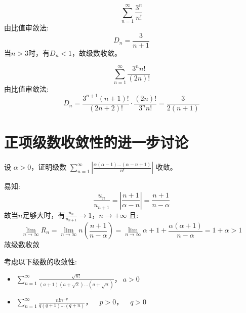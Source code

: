 \[
    \sum_{n=1}^{\infty} \frac{3^n}{n!}
\]
由比值审敛法:
\[
    D_{n} = \frac{3}{n+1}
\]
当\(n>3\)时，有\(D_{n} < 1\)，故级数收敛。

\[
    \sum_{n=1}^{\infty} \frac{3^{n}n!}{(2n)!}
\]
由比值审敛法:
\[
    D_{n} = \frac{3^{n+1}(n+1)!}{(2n+2)!} \cdot \frac{(2n)!}{3^{n}n!}
    = \frac{3}{2(n+1)}
\]

\section{正项级数收敛性的进一步讨论}

\begin{problem}
    设 \(\alpha > 0\)，证明级数 \(\sum_{n=1}^{\infty} \left|
        \frac{\alpha(\alpha - 1) \dots (\alpha - n + 1)}{n!}
    \right| \) 收敛。
\end{problem}

\begin{solution}
    易知: \[
        \frac{u_{n}}{u_{n+1}}= \left| \frac{n+1}{\alpha-n} \right| =
        \frac{n+1}{n-\alpha}
    \]
    故当\(n\)足够大时，有\(\frac{u_{n}}{u_{n+1}}\to 1\)，\(n \to +\infty\)
    且:
    \[
        \lim_{n \to \infty} R_{n} = \lim_{n \to \infty} n \left(
        \frac{n+1}{n-\alpha} \right)
        =\lim_{n \to \infty} \alpha +1 +
        \frac{\alpha(\alpha+1)}{n-\alpha} = 1+\alpha > 1
    \]
    故级数收敛
\end{solution}

\begin{problem}
    考虑以下级数的收敛性:
    \begin{itemize}
        \item \(\sum_{n=1}^{\infty}
                \frac{\sqrt{n!}}{(a+1)(a+\sqrt{2}) \dots
            (a+\sqrt{n})}，\ a > 0\)
        \item \(\sum_{n=1}^{\infty} \frac{n!n^{-p}}{q(q+1)
            \dots (q+n)}，            \quad p > 0，\quad q > 0\)
    \end{itemize}
\end{problem}

